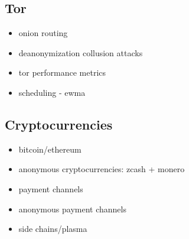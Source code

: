 \subsection{Tor}

\begin{itemize}
\item onion routing
\item deanonymization collusion attacks
\item tor performance  metrics
\item scheduling - ewma
\end{itemize}

\subsection{Cryptocurrencies}

\begin{itemize}
\item bitcoin/ethereum
\item anonymous cryptocurrencies: zcash + monero
\item payment channels
\item anonymous payment channels
\item side chains/plasma
\end{itemize}